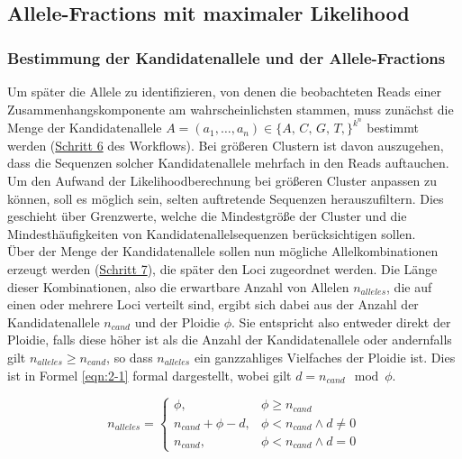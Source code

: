 \subsection{Allele-Fractions mit maximaler Likelihood} \label{subsec:sol_allele_lh}
\subsubsection{Bestimmung der Kandidatenallele und der Allele-Fractions} \label{outsubsec:sol_cand_allele}

Um später die Allele zu identifizieren, von denen die beobachteten Reads einer Zusammenhangskomponente am wahrscheinlichsten stammen, muss zunächst die Menge der Kandidatenallele $A=(a_{1}, \dots, a_{n}) \in \{A,\,C,\,G,\,T,\}^{k^n}$ bestimmt werden (\hyperref[step6]{Schritt 6\label{step6txt}} des Workflows). Bei größeren Clustern ist davon auszugehen, dass die Sequenzen solcher Kandidatenallele mehrfach in den Reads auftauchen. Um den Aufwand der Likelihoodberechnung bei größeren Cluster anpassen zu können, soll es möglich sein, selten auftretende Sequenzen herauszufiltern. Dies geschieht über Grenzwerte, welche die Mindestgröße der Cluster und die Mindesthäufigkeiten von Kandidatenallelsequenzen berücksichtigen sollen. \\

Über der Menge der Kandidatenallele sollen nun mögliche Allelkombinationen erzeugt werden (\hyperref[step7]{Schritt 7\label{step7txt}}), die später den Loci zugeordnet werden. Die Länge dieser Kombinationen, also die erwartbare Anzahl von Allelen $n_{alleles}$, die auf einen oder mehrere Loci verteilt sind, ergibt sich dabei aus der Anzahl der Kandidatenallele $n_{cand}$ und der Ploidie $\phi$. Sie entspricht also entweder direkt der Ploidie, falls diese höher ist als die Anzahl der Kandidatenallele oder andernfalls gilt $n_{alleles} \geq n_{cand}$, so dass $n_{alleles}$ ein ganzzahliges Vielfaches der Ploidie ist. Dies ist in Formel \eqref{eqn:2-1} formal dargestellt, wobei gilt $d=n_{cand} \mod \phi$.

\begin{equation} \label{eqn:2-1}
\tag{2-1}
n_{alleles} =
\left\{
\begin{array}{ll}
\phi, & \phi \geq n_{cand} \\
n_{cand} + \phi - d, & \phi < n_{cand} \wedge d \neq 0\\
n_{cand}, & \phi < n_{cand} \wedge d = 0
\end{array}
\right.
\end{equation}

